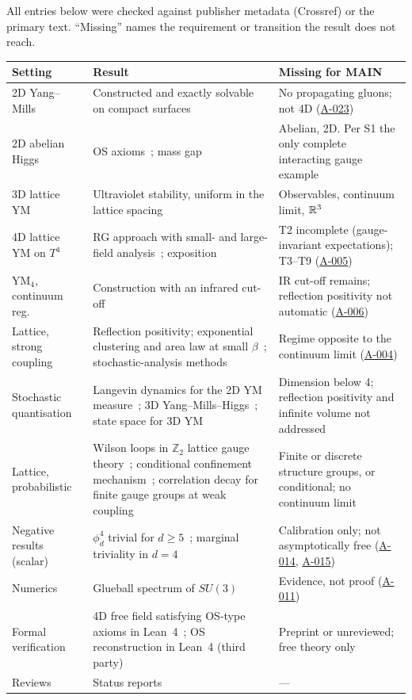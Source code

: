 \documentclass[11pt,a4paper]{article}
\newcommand{\idref}[1]{\hyperref[#1]{\textsf{#1}}}
\begin{document}
All entries below were checked against publisher metadata (Crossref) or the primary text. \enquote{Missing} names the requirement or transition the result does not reach.

\begin{center}\small
\begin{longtable}{@{}P{3.2cm}P{6.6cm}P{5.8cm}@{}}
\toprule
Setting & Result & Missing for MAIN\\
\midrule\endhead
\bottomrule\endfoot
2D Yang--Mills & Constructed and exactly solvable on compact surfaces~\cite{GKS89,Dri89,Wit91,Lev03} & No propagating gluons; not 4D (\idref{A-023})\\
2D abelian Higgs & OS axioms~\cite{BFS79}; mass gap~\cite{BBIJ84} & Abelian, 2D. Per S1 the only complete interacting gauge example\\
3D lattice YM & Ultraviolet stability, uniform in the lattice spacing~\cite{Bal85} & Observables, continuum limit, $\mathbb R^3$\\
4D lattice YM on $T^4$ & RG approach with small- and large-field analysis~\cite{Bal87,Bal88,Bal89a,Bal89b}; exposition~\cite{Dim13a,Dim13b} & T2 incomplete (gauge-invariant expectations); T3--T9 (\idref{A-005})\\
YM$_4$, continuum reg. & Construction with an infrared cut-off~\cite{MRS93} & IR cut-off remains; reflection positivity not automatic (\idref{A-006})\\
Lattice, strong coupling & Reflection positivity; exponential clustering and area law at small $\beta$~\cite{OSe78,Sei82}; stochastic-analysis methods~\cite{SZZ23} & Regime opposite to the continuum limit (\idref{A-004})\\
Stochastic quantisation & Langevin dynamics for the 2D YM measure~\cite{CCHS22}; 3D Yang--Mills--Higgs~\cite{CCHS24}; state space for 3D YM~\cite{CC24} & Dimension below 4; reflection positivity and infinite volume not addressed\\
Lattice, probabilistic & Wilson loops in $\mathbb Z_2$ lattice gauge theory~\cite{Cha20}; conditional confinement mechanism~\cite{Cha21}; correlation decay for finite gauge groups at weak coupling~\cite{AC25} & Finite or discrete structure groups, or conditional; no continuum limit\\
Negative results (scalar) & $\phi^4_d$ trivial for $d\ge5$~\cite{Aiz82,Fro82}; marginal triviality in $d=4$~\cite{ADC21,ADC24} & Calibration only; not asymptotically free (\idref{A-014}, \idref{A-015})\\
Numerics & Glueball spectrum of $SU(3)$~\cite{MP99,Chen06} & Evidence, not proof (\idref{A-011})\\
Formal verification & 4D free field satisfying OS-type axioms in Lean~4~\cite{DHMN26}; OS reconstruction in Lean~4 (third party)~\cite{OSR26} & Preprint or unreviewed; free theory only\\
Reviews & Status reports~\cite{Dou04,Dou26} & ---\\
\end{longtable}
\end{center}
\end{document}
